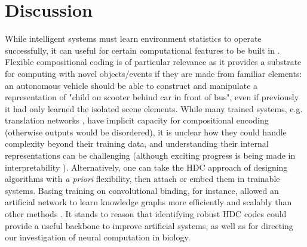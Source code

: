 \documentclass{article}
\begin{document}
\section{Discussion}

While intelligent systems must learn environment statistics to operate successfully, it can useful for certain computational features to be built in \cite{Zador:2019}. Flexible compositional coding is of particular relevance as it provides a substrate for computing with novel objects/events if they are made from familiar elements: an autonomous vehicle should be able to construct and manipulate a representation of "child on scooter behind car in front of bus", even if previously it had only learned the isolated scene elements. While many trained systems, e.g. translation networks \cite{Bahdanau:2014, Luong:2015, Wu:2016}, have implicit capacity for compositional encoding (otherwise outputs would be disordered), it is unclear how they could handle complexity beyond their training data, and understanding their internal representations can be challenging \cite{Lipton:2016} (although exciting progress is being made in interpretability \cite{Zeiler:2014, Montavon:2018}). Alternatively, one can take the HDC approach of designing algorithms with \textit{a priori} flexibility, then attach or embed them in trainable systems. Basing training on convolutional binding, for instance, allowed an artificial network to learn knowledge graphs more efficiently and scalably than other methods \cite{Nickel:2016}. It stands to reason that identifying robust HDC codes could provide a useful backbone to improve artificial systems, as well as for directing our investigation of neural computation in biology.
\end{document}

